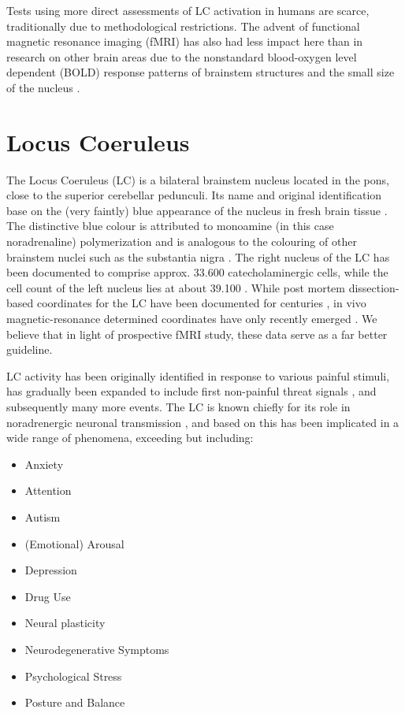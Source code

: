 	Tests using more direct assessments of LC activation in humans are scarce, traditionally due to methodological restrictions.
	The advent of functional magnetic resonance imaging (fMRI) has also had less impact here than in research on other brain areas due to the nonstandard blood-oxygen level dependent (BOLD) response patterns of brainstem structures and the small size of the nucleus \citep{Astafiev2010}.
	
    \section{Locus Coeruleus}\label{sec:b_lc}
	The Locus Coeruleus (LC) is a bilateral brainstem nucleus located in the pons, close to the superior cerebellar pedunculi.
	Its name and original identification base on the (very faintly) blue appearance of the nucleus in fresh brain tissue \citep{Maeda2000}.
	The distinctive blue colour is attributed to monoamine (in this case noradrenaline) polymerization and is analogous to the colouring of other brainstem nuclei such as the substantia nigra \citep{Mai2011}.
	The right nucleus of the LC has been documented to comprise approx. 33.600 catecholaminergic cells, while the cell count of the left nucleus lies at about 39.100 \citep{Mouton1994}.
	While post mortem dissection-based coordinates for the LC have been documented for centuries \citep{Maeda2000},
	in vivo magnetic-resonance determined coordinates have only recently emerged \citep{Keren2009}. 
	We believe that in light of prospective fMRI study, these data serve as a far better guideline. 
		
	LC activity has been originally identified in response to various painful stimuli, has gradually been expanded to include first non-painful threat signals \citep{Grant1984}, and subsequently many more events.
	The LC is known chiefly for its role in noradrenergic neuronal transmission \citep{Benarroch2009}, and based on this has been implicated in a wide range of phenomena, exceeding but including:
	\begin{multicols}{2}
	    \begin{itemize}
		\item Anxiety \citep{Weiss1994}
		\item Attention \citep{Benarroch2009}
		\item Autism \citep{Mehler2009}
		\item (Emotional) Arousal \citep{Bangasser2011,Benarroch2009}
		\item Depression \citep{Bangasser2011, Weiss1994}
		\item Drug Use \citep{Samuels2008}
		\item Neural plasticity \citep{Benarroch2009}
		\item Neurodegenerative Symptoms \citep{Samuels2008,Gesi2000}
		\item Psychological Stress \citep{Bangasser2011,Benarroch2009}
		\item Posture and Balance \citep{Benarroch2009}
	    \end{itemize}
	\end{multicols}
	
